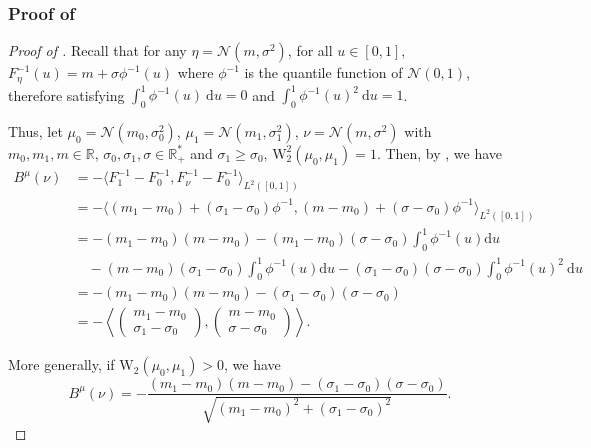 \documentclass[twoside]{article}
\newcommand{\cN}{\mathcal{N}}
\newcommand{\W}{\mathrm{W}}
\newcommand{\R}{\mathbb{R}}
\def\mo{m_{0}}
\def\m1{m_{1}}
\def\so{\sigma_{0}}
\def\s1{\sigma_{1}}
\begin{document}
\subsubsection{Proof of } \label{proof:corr_busemann_1d_gaussian}


\begin{proof}[Proof of ]
    Recall that for any $\eta=\cN(m,\sigma^2)$, for all $u\in [0,1]$, $F_\eta^{-1}(u) = m + \sigma \phi^{-1}(u)$ where $\phi^{-1}$ is the quantile function of $\cN(0,1)$, therefore satisfying $\int_0^1 \phi^{-1}(u)\ \mathrm{d}u=0$ and $\int_0^1 \phi^{-1}(u)^2\ \mathrm{d}u = 1$.

    Thus, let $\mu_0=\cN(\mo,\so^2)$, $\mu_1=\cN(\m1,\s1^2)$, $\nu=\cN(m,\sigma^2)$ with $m_0,m_1,m\in \R$, $\sigma_0,\sigma_1,\sigma\in \R_+^*$ and $\sigma_1\ge \sigma_0$, $\W_2^2(\mu_0,\mu_1)=1$. Then, by , we have
    \begin{equation}
        \begin{aligned}
            B^\mu(\nu) &= - \langle F_1^{-1} - F_0^{-1}, F_\nu^{-1} - F_0^{-1}\rangle_{L^2([0,1])} \\
            &= -\langle (m_1-m_0) + (\sigma_1-\sigma_0)\phi^{-1}, (m-m_0) + (\sigma-\sigma_0)\phi^{-1}\rangle_{L^2([0,1])} \\
            &= - (m_1-m_0)(m-m_0) - (m_1-m_0)(\sigma-\sigma_0) \int_0^1 \phi^{-1}(u)\mathrm{d}u \\ &\quad- (m-m_0)(\sigma_1-\sigma_0) \int_0^1 \phi^{-1}(u)\mathrm{d}u - (\sigma_1-\sigma_0)(\sigma - \sigma_0)\int_0^1 \phi^{-1}(u)^2\ \mathrm{d}u \\
            &= - (\m1-\mo)(m-\mo) - (\s1-\so)(\sigma-\so) \\
            &= - \left\langle 
            \begin{pmatrix}
                \m1-\mo \\ \s1-\so
            \end{pmatrix}, 
            \begin{pmatrix}
                m-\mo \\ \sigma-\so
            \end{pmatrix} \right\rangle.
        \end{aligned}
    \end{equation}

    More generally, if $\W_2(\mu_0,\mu_1)>0$, we have
    \begin{equation}
        B^\mu(\nu) = - \frac{(\m1-\mo)(m-\mo) - (\s1-\so)(\sigma-\so)}{\sqrt{(\m1-\mo)^2 + (\s1-\so)^2}}.
    \end{equation}
\end{proof}
\end{document}
